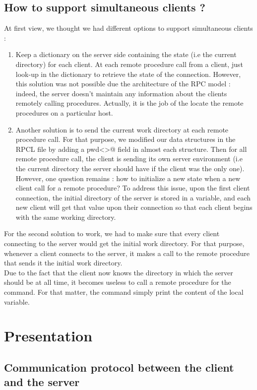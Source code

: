 \documentclass{article}
\begin{document}
\subsection{How to support simultaneous clients ?}
At first view, we thought we had different options to support simultaneous clients :
\begin{enumerate}
\item Keep a dictionary on the server side containing the state (i.e the current directory) for each client. At each remote procedure call from a client, just look-up in the dictionary to retrieve the state of the connection. However, this solution was not possible due the architecture of the RPC model : indeed, the server doesn't maintain any information about the clients remotely calling procedures. Actually, it is the job of the \verb@PortMapper@ locate the remote procedures on a particular host.
\item Another solution is to send the current work directory at each remote procedure call. For that purpose, we modified our data structures in the RPCL file by adding a \verb@string pwd<>@ field in almost each structure. Then for all remote procedure call, the client is sending its own server environment (i.e the current directory the server should have if the client was the only one). However, one question remains : how to initialize a new state when a new client call for a remote procedure? To address this issue, upon the first client connection, the initial directory of the server is stored in a variable, and each new client will get that value upon their connection so that each client begins with the same working directory.
\end{enumerate}
For the second solution to work, we had to make sure that every client connecting to the server would get the initial work directory.
For that purpose, whenever a client connects to the server, it makes a call to the remote procedure \verb@pwd@ that sends it the initial work directory. \\
Due to the fact that the client now knows the directory in which the server should be at all time, it becomes useless to call a remote procedure for the \verb@pwd@ command. For that matter, the command simply print the content of the local variable.

\section{Presentation}
\subsection{Communication protocol between the client and the server}
\end{document}

